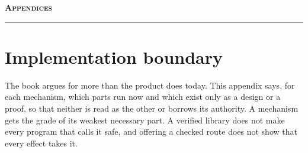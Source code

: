 
\clearpage
{}\label{book:appendices}
\begin{center}
  \vspace*{0.3cm}
  {\Huge\scshape\bfseries Appendices\par}
  \vspace{0.2cm}
  {\color{hhcobalt}\rule{0.3\textwidth}{1.5pt}}\par
  \vspace{0.4cm}
\end{center}
\appendix
\renewcommand{\thesection}{\Alph{section}}
\renewcommand{\thefigure}{\thesection.\arabic{figure}}
\renewcommand{\thetable}{\thesection.\arabic{table}}
\renewcommand{\theHsection}{volume.appendix.\arabic{section}}
\renewcommand{\theHsubsection}{volume.appendix.\arabic{section}.\arabic{subsection}}
\renewcommand{\theHsubsubsection}{volume.appendix.\arabic{section}.\arabic{subsection}.\arabic{subsubsection}}
\renewcommand{\theHfigure}{volume.appendix.\arabic{section}.\arabic{figure}}
\renewcommand{\theHtable}{volume.appendix.\arabic{section}.\arabic{table}}
\renewcommand{\theHequation}{volume.appendix.\arabic{equation}}
\renewcommand{\theHlstlisting}{volume.appendix.\arabic{lstlisting}}

\section{Implementation boundary}\label{app:volume-status}

The book argues for more than the product does today. This appendix says, for
each mechanism, which parts run now and which exist only as a design or a
proof, so that neither is read as the other or borrows its authority. A
mechanism gets the grade of its
weakest necessary part. A verified library does not make every program that
calls it safe, and offering a checked route does not show that every effect
takes it.

